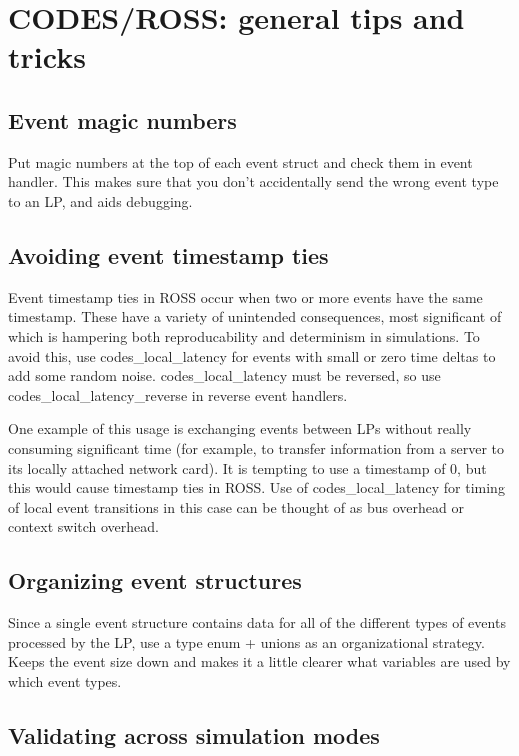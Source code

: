 \documentclass[conference,10pt,compsocconf,onecolumn]{IEEEtran}
\begin{document}
\section{CODES/ROSS: general tips and tricks}

\subsection{Event magic numbers}

Put magic numbers at the top of each event struct and
check them in event handler.  This makes sure that you don't accidentally
send the wrong event type to an LP, and aids debugging.

\subsection{Avoiding event timestamp ties}

Event timestamp ties in ROSS occur when two or more events have the same
timestamp. These have a variety of unintended consequences, most significant of
which is hampering both reproducability and determinism in simulations. To
avoid this, use codes\_local\_latency for events with small or zero time deltas
to add some random noise. codes\_local\_latency must be reversed, so use
codes\_local\_latency\_reverse in reverse event handlers.

One example of this usage is exchanging events between LPs without really
consuming significant time (for example, to transfer information from a server
to its locally attached network card). It is tempting to use a timestamp of 0,
but this would cause timestamp ties in ROSS. Use of codes\_local\_latency for
timing of local event transitions in this case can be thought of as bus
overhead or context switch overhead.

\subsection{Organizing event structures}

Since a single event structure contains data for all of the different types of
events processed by the LP, use a type enum + unions as an organizational
strategy. Keeps the event size down and makes it a little clearer what
variables are used by which event types.

\subsection{Validating across simulation modes}
\end{document}
